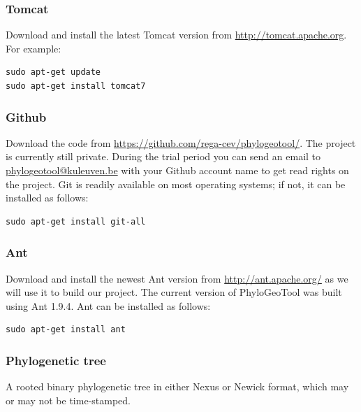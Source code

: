 \documentclass[a4paper, 11pt]{article} %
\begin{document}
\subsubsection*{Tomcat}
Download and install the latest Tomcat version from \url{http://tomcat.apache.org}.
For example:
\begin{verbatim}
sudo apt-get update
sudo apt-get install tomcat7
\end{verbatim}

\subsubsection*{Github}
Download the code from \url{https://github.com/rega-cev/phylogeotool/}. 
The project is currently still private. 
During the trial period you can send an email to \href{mailto:phylogeotool@kuleuven.be}  {phylogeotool@kuleuven.be} with your Github account name to get read rights on the project.
Git is readily available on most operating systems; if not, it can be installed as follows:
\begin{verbatim}
sudo apt-get install git-all
\end{verbatim}

\subsubsection*{Ant}
Download and install the newest Ant version from \url{http://ant.apache.org/} as we will use it to build our project.
The current version of PhyloGeoTool was built using Ant 1.9.4.
Ant can be installed as follows:
\begin{verbatim}
sudo apt-get install ant
\end{verbatim}

\subsubsection*{Phylogenetic tree}
A rooted binary phylogenetic tree in either Nexus or Newick format, which may or may not be time-stamped.
\end{document}
